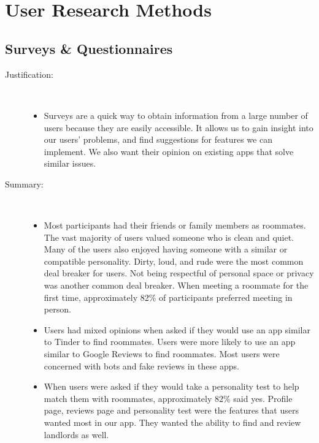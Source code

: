 \documentclass{article}
\begin{document}
\\~\\
\section{User Research Methods}
\subsection{Surveys \& Questionnaires}
\begin{description}
    \item[Justification:]
        \newline \,
        \begin{itemize}
            \item Surveys are a quick way to obtain information from a large number of users  because 
            they are easily accessible. It allows us to gain insight into our users' problems, and 
            find suggestions for features we can implement. We also want their opinion on existing 
            apps that solve similar issues.
        \end{itemize}
    \item [Summary:]
        \newline \,
        \begin{itemize}
            \item  Most participants had their friends or family members as roommates. The vast 
            majority of users valued someone who is clean and quiet. Many of the users also enjoyed 
            having someone with a similar or compatible personality. Dirty, loud, and rude were the 
            most common deal breaker for users. Not being respectful of personal space or privacy was 
            another common deal breaker. When meeting a roommate for the first time, approximately 
            82\% of participants preferred meeting in person.
            \item Users had mixed opinions when asked if they would use an app similar to Tinder to 
            find roommates. Users were more likely to use an app similar to Google Reviews to find 
            roommates. Most users were concerned with bots and fake reviews in these apps.
            \item When users were asked if they would take a personality test to help match them with 
            roommates, approximately 82\% said yes. Profile page, reviews page and personality test 
            were the features that users wanted most in our app. They wanted the ability to find and 
            review landlords as well.
        

\end{itemize}
\end{description}
\end{document}
